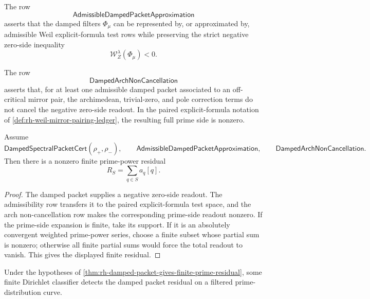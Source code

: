 \begin{definition}[AdmissibleDampedPacketApproximation]
\label{def:rh-admissible-damped-packet-approximation}
The row
$$
\mathsf{AdmissibleDampedPacketApproximation}
$$
asserts that the damped filters $\Phi_\mu$ can be represented by, or
approximated by, admissible Weil explicit-formula test rows while
preserving the strict negative zero-side inequality
$$
\mathcal W_Z^\lambda(\Phi_\mu)<0.
$$
\end{definition}

\begin{definition}
\label{def:rh-damped-arch-noncancellation}
The row
$$
\mathsf{DampedArchNonCancellation}
$$
asserts that, for at least one admissible damped packet associated to
an off-critical mirror pair, the archimedean, trivial-zero, and pole
correction terms do not cancel the negative zero-side readout.  In the
paired explicit-formula notation of
\autoref{def:rh-weil-mirror-pairing-ledger}, the resulting full prime
side is nonzero.
\end{definition}

\begin{theorem}
\label{thm:rh-damped-packet-gives-finite-prime-residual}
Assume
$$
\mathsf{DampedSpectralPacketCert}(\rho_+,\rho_-),
\qquad
\mathsf{AdmissibleDampedPacketApproximation},
\qquad
\mathsf{DampedArchNonCancellation}.
$$
Then there is a nonzero finite prime-power residual
$$
R_S=\sum_{q\in S}a_q[q].
$$
\end{theorem}

\begin{proof}
The damped packet supplies a negative zero-side readout.  The
admissibility row transfers it to the paired explicit-formula test
space, and the arch non-cancellation row makes the corresponding
prime-side readout nonzero.  If the prime-side expansion is finite, take
its support.  If it is an absolutely convergent weighted prime-power
series, choose a finite subset whose partial sum is nonzero; otherwise
all finite partial sums would force the total readout to vanish.  This
gives the displayed finite residual.
\end{proof}

\begin{theorem}
\label{thm:rh-damped-packet-supplies-filtered-prime-detection}
Under the hypotheses of
\autoref{thm:rh-damped-packet-gives-finite-prime-residual}, some finite
Dirichlet classifier detects the damped packet residual on a filtered
prime-distribution curve.
\end{theorem}

